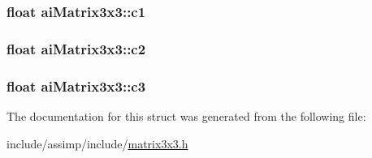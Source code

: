 \hypertarget{structai_matrix3x3_ae62a2877076cbee151e89cb34567e3ca}{
\subsubsection[{c1}]{\setlength{\rightskip}{0pt plus 5cm}float ai\-Matrix3x3\-::c1}}\label{structai_matrix3x3_ae62a2877076cbee151e89cb34567e3ca}
\hypertarget{structai_matrix3x3_a8e0d85d5c46eb4f4478f1fe159be4320}{
\subsubsection[{c2}]{\setlength{\rightskip}{0pt plus 5cm}float ai\-Matrix3x3\-::c2}}\label{structai_matrix3x3_a8e0d85d5c46eb4f4478f1fe159be4320}
\hypertarget{structai_matrix3x3_aa7eef894dec22db1011092410b24f19b}{
\subsubsection[{c3}]{\setlength{\rightskip}{0pt plus 5cm}float ai\-Matrix3x3\-::c3}}\label{structai_matrix3x3_aa7eef894dec22db1011092410b24f19b}


The documentation for this struct was generated from the following file\-:\begin{DoxyCompactItemize}
\item 
include/assimp/include/\hyperlink{matrix3x3_8h}{matrix3x3.\-h}\end{DoxyCompactItemize}
